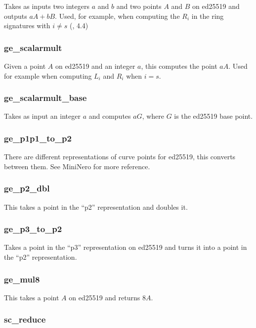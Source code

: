 \documentclass[12pt,english]{mrl}
\numberwithin{equation}{section}
\numberwithin{figure}{section}
\begin{document}
Takes as inputs two integers $a$ and $b$ and two points $A$ and $B$ on ed25519
and outputs $aA+bB$. Used, for example, when computing the $R_{i}$
in the ring signatures with $i\neq s$ (\cite{CN}, 4.4)


\subsubsection{ge\_scalarmult}

Given a point $A$ on ed25519 and an integer $a$, this computes
the point $aA$. Used for example when computing $L_{i}$ and $R_{i}$
when $i=s$. 


\subsubsection{ge\_scalarmult\_base}

Takes as input an integer $a$ and computes $aG$, where $G$ is the
ed25519 base point. 


\subsubsection{ge\_p1p1\_to\_p2}

There are different representations of curve points for ed25519, this
converts between them. See MiniNero for more reference. 


\subsubsection{ge\_p2\_dbl}

This takes a point in the ``p2'' representation and doubles it.


\subsubsection{ge\_p3\_to\_p2}

Takes a point in the ``p3'' representation on ed25519 and turns
it into a point in the ``p2'' representation. 


\subsubsection{ge\_mul8}

This takes a point $A$ on ed25519 and returns $8A$. 


\subsubsection{sc\_reduce}
\end{document}
